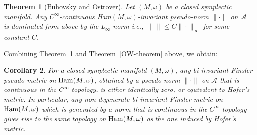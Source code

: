 \documentclass{icmart}
\newtheorem{theorem}{Theorem}[section]
\newtheorem{corollary}[theorem]{Corollary}
\theoremstyle{definition}
\begin{document}
\begin{theorem}[Buhovsky and Ostrover]  \label{Main-thm-BO} Let $(M,\omega)$ be a closed symplectic manifold.
Any $C^{\infty}$-continuous {\rm Ham}$(M,\omega)$-invariant pseudo-norm $\| \cdot \|$ on
${\mathcal A}$
is dominated  from above by the $L_{\infty}$-norm i.e., $\| \cdot \|
\leq C \| \cdot \|_{\infty}$ for some constant $C$.
\end{theorem}


Combining Theorem~\ref{Main-thm-BO} and Theorem~\ref{OW-theorem} above, we obtain:


\begin{corollary} For a closed symplectic manifold $(M,\omega)$, any bi-invariant Finsler pseudo-metric on ${\rm Ham}(M,\omega)$,
obtained by a pseudo-norm $\| \cdot \|$ on ${\mathcal A}$ that is
continuous in the $C^{\infty}$-topology, is either identically zero, 
or equivalent %
to Hofer's metric. In particular, any
non-degenerate bi-invariant Finsler metric on ${\rm Ham}(M,\omega)$ which
is generated by a norm that is continuous in the
$C^{\infty}$-topology  gives rise to the same topology on
${\rm Ham}(M,\omega)$ as the one induced by Hofer's metric.
\end{corollary}



\end{document}
